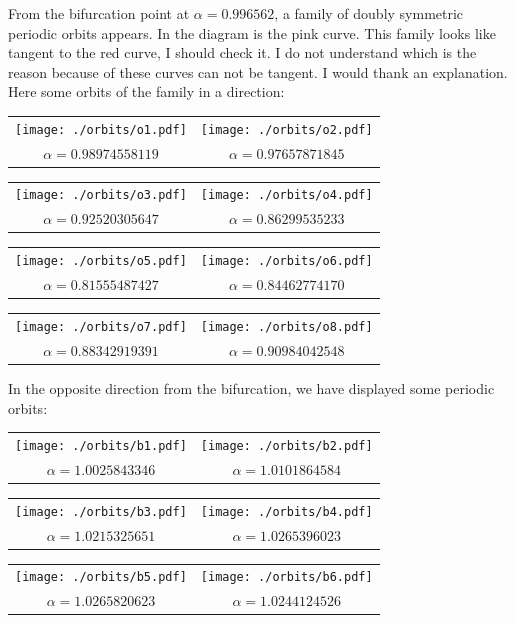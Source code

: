 \documentclass{article}
\begin{document}
From the bifurcation point at $\alpha= 0.996562$, a family of doubly symmetric periodic orbits appears. In the diagram is the pink curve. 
This family looks like tangent to the red curve, I should check it. I do not understand which is the reason because of these curves can not be tangent. I would thank an explanation.  Here some orbits of the family in a direction:

\begin{tabular}{cc}
\texttt{[image: ./orbits/o1.pdf]}&
\texttt{[image: ./orbits/o2.pdf]} \\
$\alpha= 0.98974558119$&$ \alpha=0.97657871845 $
\end{tabular}

\begin{tabular}{cc}
\texttt{[image: ./orbits/o3.pdf]}&
\texttt{[image: ./orbits/o4.pdf]}\\
$\alpha= 0.92520305647$&$ \alpha= 0.86299535233$
\end{tabular}

\begin{tabular}{cc}
\texttt{[image: ./orbits/o5.pdf]}&
\texttt{[image: ./orbits/o6.pdf]}\\
$\alpha= 0.81555487427$&$ \alpha=0.84462774170 $
\end{tabular}

\begin{tabular}{cc}
\texttt{[image: ./orbits/o7.pdf]}&
\texttt{[image: ./orbits/o8.pdf]}\\
$\alpha=0.88342919391 $&$ \alpha=0.90984042548 $
\end{tabular}

In the opposite direction from the bifurcation, we have displayed some periodic orbits: 

\begin{tabular}{cc}
\texttt{[image: ./orbits/b1.pdf]}&
\texttt{[image: ./orbits/b2.pdf]}\\
$\alpha=1.0025843346 $&$ \alpha= 1.0101864584$
\end{tabular}

\begin{tabular}{cc}
\texttt{[image: ./orbits/b3.pdf]}&
\texttt{[image: ./orbits/b4.pdf]}\\
$\alpha= 1.0215325651$&$ \alpha= 1.0265396023$
\end{tabular}

\begin{tabular}{cc}
\texttt{[image: ./orbits/b5.pdf]}&
\texttt{[image: ./orbits/b6.pdf]}\\
$\alpha= 1.0265820623$&$ \alpha= 1.0244124526$
\end{tabular}
\end{document}
